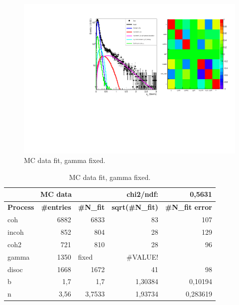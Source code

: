\documentclass{beamer}
\begin{document}
\begin{frame}

\begin{figure}[!ht]
\centering
 {\includegraphics[width=\textwidth]{3Pt_fit.pdf}
\caption{MC data fit, gamma fixed.} 
\label{fig:}}
\end{figure}

\end{frame}
\begin{frame}

\begin{table}[bp]
\begin{center}
\begin{tabular}{|l|r|r|r|r|}
\hline
\multicolumn{3}{|c|}{\textbf{MC data}} & chi2/ndf: & 0,5631 \\ \hline
\textbf{Process} & \multicolumn{1}{l|}{\textbf{\#entries}} & \multicolumn{1}{l|}{\textbf{\#N\_fit}} & \multicolumn{1}{l|}{\textbf{sqrt(\#N\_fit)}} & \multicolumn{1}{l|}{\textbf{\#N\_fit error}} \\ \hline
coh & 6882 & 6833 & 83 & 107 \\ \hline
incoh & 852 & 804 & 28 & 129 \\ \hline
coh2 & 721 & 810 & 28 & 96 \\ \hline
gamma & 1350 & \multicolumn{1}{l|}{fixed} & \#VALUE! & \multicolumn{1}{l|}{} \\ \hline
disoc & 1668 & 1672 & 41 & 98 \\ \hline
b & 1,7 & 1,7 & 1,30384 & 0,10194 \\ \hline
n & 3,56 & 3,7533 & 1,93734 & 0,283619 \\ \hline
\end{tabular}
\end{center}
\caption{MC data fit, gamma fixed.}
\label{}
\end{table}

\end{frame}
\end{document}
